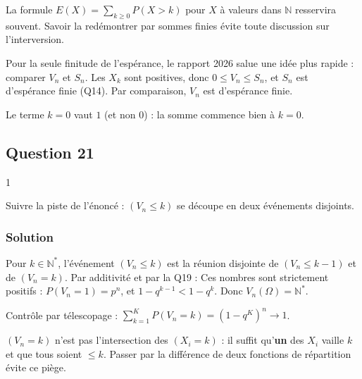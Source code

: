 \documentclass[11pt,a4paper]{article}
\newcommand{\equationajustee}[1]{%
  \sbox{\boiteequation}{$\displaystyle #1$}%
  \ifdim\wd\boiteequation>\linewidth
    \[\resizebox{\linewidth}{!}{\usebox{\boiteequation}}\]%
  \else
    \[#1\]%
  \fi}
\begin{document}
\begin{methode}

La formule \(E(X)=\sum_{k\ge0}P(X>k)\) pour \(X\) à valeurs dans \(\mathbb N\) resservira souvent. Savoir la redémontrer par sommes finies évite toute discussion sur l'interversion.

\end{methode}

\begin{methode}

Pour la seule finitude de l'espérance, le rapport 2026 salue une idée plus rapide : comparer \(V_n\) et \(S_n\). Les \(X_k\) sont positives, donc \(0\le V_n\le S_n\), et \(S_n\) est d'espérance finie (Q14). Par comparaison, \(V_n\) est d'espérance finie.

\end{methode}

\begin{piege}

Le terme \(k=0\) vaut \(1\) (et non \(0\)) : la somme commence bien à \(k=0\).

\end{piege}

\hypertarget{question-21}{%
\subsection{Question 21}\label{question-21}}

\begin{indication}{1}

Suivre la piste de l'énoncé : \((V_n\le k)\) se découpe en deux événements disjoints.

\end{indication}

\hypertarget{solution-20}{%
\subsubsection{Solution}\label{solution-20}}

Pour \(k\in\mathbb N^*\), l'événement \((V_n\le k)\) est la réunion disjointe de \((V_n\le k-1)\) et de \((V_n=k)\). Par additivité et par la Q19 :
\equationajustee{\boxed{P(V_n=k)=(1-q^k)^n-(1-q^{k-1})^n.}}
Ces nombres sont strictement positifs : \(P(V_n=1)=p^n\), et \(1-q^{k-1}<1-q^k\). Donc \(V_n(\Omega)=\mathbb N^*\).

Contrôle par télescopage : \(\sum_{k=1}^KP(V_n=k)=(1-q^K)^n\to1\).

\begin{piege}

\((V_n=k)\) n'est pas l'intersection des \((X_i=k)\) : il suffit qu'\textbf{un} des \(X_i\) vaille \(k\) et que tous soient \(\le k\). Passer par la différence de deux fonctions de répartition évite ce piège.

\end{piege}
\end{document}
